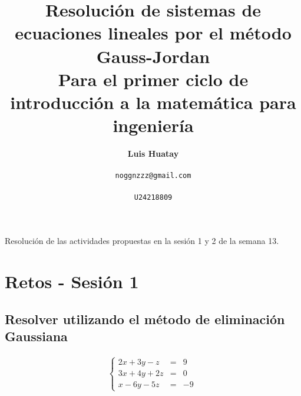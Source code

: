 \documentclass[10pt, a4paper]{article}
\title{\textbf{Resolución de sistemas de ecuaciones lineales por el método Gauss-Jordan} \\ 
\vspace{0.5cm}
\large \textbf{Para el primer ciclo de introducción a la matemática para ingeniería}}
\author{\textbf{Luis Huatay}\\\\\texttt{noggnzzz@gmail.com}\\\\\texttt{U24218809}}
\begin{document}
\maketitle
\begin{center}
Resolución de las actividades propuestas en la sesión 1 y 2 de la semana 13.
\end{center}
\restoregeometry

\newpage
{}
\section{Retos - Sesión 1}
\subsection{Resolver utilizando el método de eliminación Gaussiana}
\vspace{-0.5cm}
\begin{align*}
  \left\{
  \begin{array}{rcl}
    2x+3y-z &= &9\\
    3x+4y+2z &= &0\\
    x-6y-5z &= &-9
  \end{array}
  \right.\
\end{align*}
\end{document}
